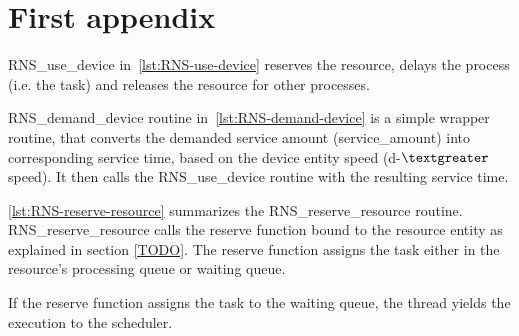 \chapter{First appendix}
\label{chapter:first-appendix}


RNS\_use\_device in~\ref{lst:RNS-use-device} reserves the resource, delays the process (i.e. the task) and releases the resource for other processes.



RNS\_demand\_device routine in~\ref{lst:RNS-demand-device} is a simple wrapper routine, that converts the demanded service amount (service\_amount) into corresponding service time, based on the device entity speed (d-$\textgreater$speed). It then calls the RNS\_use\_device routine with the resulting service time.



\ref{lst:RNS-reserve-resource} summarizes the RNS\_reserve\_resource routine. RNS\_reserve\_resource calls the reserve function bound to the resource entity as explained in section \ref{TODO}. The reserve function assigns the task either in the resource's processing queue or waiting queue.

If the reserve function assigns the task to the waiting queue, the thread yields the execution to the scheduler.




